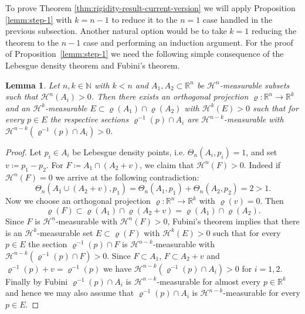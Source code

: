 \documentclass[reqno]{amsart}
\newtheorem{lemma}[theorem]{Lemma}
\numberwithin{equation}{section}
\newcommand{\R}{\mathbb{R}}
\renewcommand{\rho}{\varrho}
\begin{document}
To prove Theorem \ref{thm:rigidity-result-current-version} we will apply Proposition \ref{lemm:step-1} with $k=n-1$ to reduce it to the $n=1$ case handled in the previous subsection. Another natural option would be to take $k=1$ reducing the theorem to the $n-1$ case and performing an induction argument. 
For the proof of Proposition~\ref{lemm:step-1} we need the following simple consequence of the Lebesgue density theorem and Fubini's theorem. 
\begin{lemma}
\label{cor:projection-from-dense-set}
Let $n,k \in \mathbb{N}$ with $k<n$ and $A_1,A_2\subset \mathbb{R}^n$ be $\mathcal{H}^n$-measurable subsets such that $\mathcal{H}^n(A_i)>0$. Then there exists an orthogonal projection $\rho \colon \mathbb{R}^n\to \mathbb{R}^{k}$ and an $\mathcal{H}^{k}$-measurable $E\subset \rho(A_1)\cap \rho(A_2)$ with $\mathcal{H}^{k}(E)>0$ such that for every $p\in E$ the respective sections $\rho^{-1}(p)\cap A_i$ are $\mathcal{H}^{n-k}$-measurable with $\mathcal{H}^{n-k}(\rho^{-1}(p)\cap A_i)>0$.
\end{lemma}
\begin{proof}
Let $p_i\in A_i$ be Lebesgue density points, i.e. $\Theta_n(A_i,p_i)=1$, and set $v\coloneqq p_1-p_2$. For $F\coloneqq A_1\cap (A_2+v)$, we claim that $\mathcal{H}^n(F)>0$. Indeed if $\mathcal{H}^n(F)=0$ we arrive at the following contradiction:
\[\Theta_n(A_1\cup (A_2+v),p_1)=\Theta_n(A_1,p_1)+\Theta_n(A_2,p_2)=2>1.\] 
Now we choose an orthogonal projection $\rho \colon \mathbb{R}^{n}\to \R^{k}$ with $\rho(v)=0$. Then \[\rho(F)\subset \rho(A_1)\cap \rho(A_2+v)=\rho(A_1)\cap\rho(A_2).\] Since $F$ is $\mathcal{H}^n$-measurable with $\mathcal{H}^n(F)>0$, Fubini's theorem implies that there is an $\mathcal{H}^{k}$-measurable set $E\subset \rho(F)$ with $\mathcal{H}^{k}(E)>0$ such that for every $p\in E$ the section $\rho^{-1}(p)\cap F$ is $\mathcal{H}^{n-k}$-measurable with $\mathcal{H}^{n-k}(\rho^{-1}(p)\cap F)>0$. Since $F\subset A_1$, $F\subset A_2+v$ and $\rho^{-1}(p)+v=\rho^{-1}(p)$ we have $\mathcal{H}^{n-k}(\rho^{-1}(p)\cap A_i)>0$ for \(i=1,2\). Finally by Fubini $\rho^{-1}(p)\cap A_i$ is $\mathcal{H}^{n-k}$-measurable for almost every $p\in \R^{k}$ and hence we may also assume that $\rho^{-1}(p)\cap A_i$ is $\mathcal{H}^{n-k}$-measurable for every $p\in E$.
\end{proof}
\end{document}
